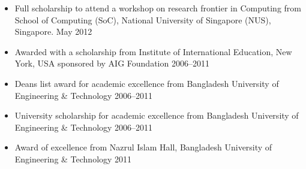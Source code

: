 \documentclass[11pt]{res}
\begin{document}
\begin{resume}
\begin{itemize}
\begin{comment}
 \item Full tuition waiver and a graduate assistantship, Department of Computer Science, University of Waterloo, Canada (not availed) \hfill 2014--2019

\end{comment}
 
 
 \item Full scholarship to attend a workshop on research frontier in Computing from School
of Computing (SoC), National University of Singapore (NUS), Singapore.  May 2012
  \item  Awarded with a scholarship from Institute of International Education, New York, USA sponsored
by AIG Foundation \hfill 2006--2011
\item  Deans list award for academic excellence from Bangladesh University of Engineering \& Technology\hfill
2006--2011
\item  University scholarship for academic excellence from Bangladesh University of Engineering \& Technology \hfill 2006--2011
\item Award of excellence from Nazrul Islam Hall, Bangladesh University of Engineering \& Technology \hfill 2011
\end{itemize}

\begin{comment}

\section{TECHNICAL SKILLS}
\textbf{Programming language}: C, C++, Java, SQL, Python, Scala, \LaTeX, \TeX \\
\textbf{Scientific Computing}: Matlab, WEKA \\
\textbf{Open Source Packages}: Apache Lucene, Apache OpenNLP \\
\textbf{Big Data Tools}: Elasticsearch, Apache Spark, Spark-SQL, Hive\\
\textbf{Web Programming}: HTML, CSS, PHP, Jade, JavaScript, Node.js \\
\textbf{Database Management System}: Oracle, MySQL, MongoDB, JSON \\
\textbf{Data Mining/Machine Learning}: Naive Bayes, Logistic Regression, Linear Regression, Neural Networks, Support Vector Machine, K-Nearest Neighbour, K-means, Recommendation Systems, Expectation Maximization (EM), Hidden Markov Model, Natural Language Processing (NLP) \\
\textbf{Text mining}: Language Model, Probabilistic Latent Semantic Analysis (pLSA), Latent Dirichlet Allocation (LDA), Hidden Topic Markov Model (HTMM)\\
\textbf{Version Control}: Git \\
\textbf{Project Build Tools:} Apache Maven, SBT \\
\textbf{Operating Systems}: Microsoft Windows, Linux
\end{comment}




\end{resume}
\end{document}
